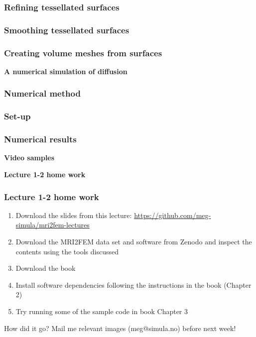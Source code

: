 \documentclass[mathserif, aspectratio=169]{beamer}
\newcommand{\mysection}[1]{\begin{frame} \begin{center} \vspace{3em} \textbf{#1} \end{center} \end{frame}}
\begin{document}
\begin{frame}
\frametitle{Refining tessellated surfaces}
\end{frame}

\begin{frame}
\frametitle{Smoothing tessellated surfaces}
\end{frame}

\begin{frame}
\frametitle{Creating volume meshes from surfaces}
\end{frame}

\mysection{A numerical simulation of diffusion}

\begin{frame}
\frametitle{Numerical method}
\end{frame}

\begin{frame}
\frametitle{Set-up}
\end{frame}

\begin{frame}
\frametitle{Numerical results}
\end{frame}

\mysection{Video samples}

\mysection{Lecture 1-2 home work}

\begin{frame}
\frametitle{Lecture 1-2 home work}
\begin{enumerate}
\item
  Download the slides from this lecture:  \href{https://github.com/meg-simula/mri2fem-lectures}{https://github.com/meg-simula/mri2fem-lectures}
\item
  Download the MRI2FEM data set and software from Zenodo and inspect
  the contents using the tools discussed
\item
  Download the book
\item
  Install software dependencies following the instructions in the book (Chapter 2)
\item
  Try running some of the sample code in book Chapter 3
\end{enumerate}
How did it go? Mail me relevant images (meg@simula.no) before next week! 
\end{frame}

\end{document}
